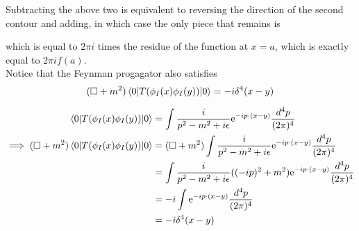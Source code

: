 \documentclass[11pt, notitlepage]{report}
\newcommand{\e}{\mathrm{e}}
\numberwithin{equation}{section}
\begin{document}
    Subtracting the above two is equivalent to reversing the direction of the second contour and adding, in which case the only piece that remains is 
    \begin{figure}[h]
        \centering
    \end{figure}

    which is equal to \(2\pi i\) times the residue of the function at \(x=a\), which is exactly equal to \(2\pi i f(a)\).\\

    Notice that the Feynman progagator also satisfies 
    \begin{equation*}
        (\square + m^2) \braket{0|T(\phi_I(x) \phi_I(y))|0} = -i\delta^4(x-y)
    \end{equation*}

    \textcolor{red}{
        \begin{align*}
                \braket{0|T(\phi_I(x) \phi_I(y))|0} &= \int\frac{i}{p^2 - m^2 + i\epsilon} \e^{-ip\cdot(x-y)}\frac{d^4p}{(2\pi)^4} \\
                \implies (\square + m^2) \braket{0|T(\phi_I(x) \phi_I(y))|0} &= (\square + m^2) \int\frac{i}{p^2 - m^2 + i\epsilon} \e^{-ip\cdot(x-y)}\frac{d^4p}{(2\pi)^4} \\
                &= \int \frac{i}{p^2 - m^2 + i\epsilon} ((-ip)^2 + m^2) \e^{-ip\cdot(x-y)}\frac{d^4p}{(2\pi)^4}\\
                &= -i \int \e^{-ip\cdot(x-y)}\frac{d^4p}{(2\pi)^4}\\
                &= -i\delta^4(x-y)
        \end{align*}
    }
    
\end{document}
